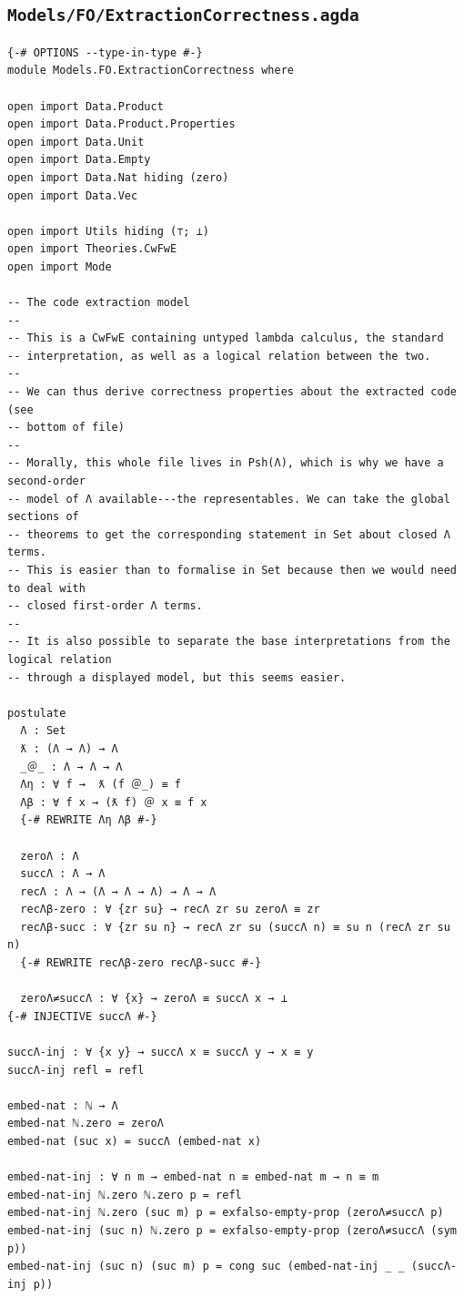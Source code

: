 \documentclass[10pt,a4paper]{article}
\theoremstyle{definition}
\theoremstyle{remark}
\begin{document}
\subsection*{\texttt{Models/FO/ExtractionCorrectness.agda}}
{\agdafont\begin{Verbatim}[breaklines=true,breakanywhere=true,fontsize=\scriptsize]
{-# OPTIONS --type-in-type #-}
module Models.FO.ExtractionCorrectness where

open import Data.Product
open import Data.Product.Properties
open import Data.Unit
open import Data.Empty
open import Data.Nat hiding (zero)
open import Data.Vec

open import Utils hiding (⊤; ⊥)
open import Theories.CwFwE
open import Mode

-- The code extraction model
--
-- This is a CwFwE containing untyped lambda calculus, the standard
-- interpretation, as well as a logical relation between the two.
--
-- We can thus derive correctness properties about the extracted code (see
-- bottom of file)
--
-- Morally, this whole file lives in Psh(Λ), which is why we have a second-order
-- model of Λ available---the representables. We can take the global sections of
-- theorems to get the corresponding statement in Set about closed Λ terms.
-- This is easier than to formalise in Set because then we would need to deal with
-- closed first-order Λ terms.
--
-- It is also possible to separate the base interpretations from the logical relation
-- through a displayed model, but this seems easier.

postulate
  Λ : Set
  ƛ : (Λ → Λ) → Λ
  _＠_ : Λ → Λ → Λ
  Λη : ∀ f →  ƛ (f ＠_) ≡ f
  Λβ : ∀ f x → (ƛ f) ＠ x ≡ f x
  {-# REWRITE Λη Λβ #-}

  zeroΛ : Λ
  succΛ : Λ → Λ
  recΛ : Λ → (Λ → Λ → Λ) → Λ → Λ
  recΛβ-zero : ∀ {zr su} → recΛ zr su zeroΛ ≡ zr
  recΛβ-succ : ∀ {zr su n} → recΛ zr su (succΛ n) ≡ su n (recΛ zr su n)
  {-# REWRITE recΛβ-zero recΛβ-succ #-}

  zeroΛ≠succΛ : ∀ {x} → zeroΛ ≡ succΛ x → ⊥
{-# INJECTIVE succΛ #-}

succΛ-inj : ∀ {x y} → succΛ x ≡ succΛ y → x ≡ y
succΛ-inj refl = refl

embed-nat : ℕ → Λ
embed-nat ℕ.zero = zeroΛ
embed-nat (suc x) = succΛ (embed-nat x)

embed-nat-inj : ∀ n m → embed-nat n ≡ embed-nat m → n ≡ m
embed-nat-inj ℕ.zero ℕ.zero p = refl
embed-nat-inj ℕ.zero (suc m) p = exfalso-empty-prop (zeroΛ≠succΛ p)
embed-nat-inj (suc n) ℕ.zero p = exfalso-empty-prop (zeroΛ≠succΛ (sym p))
embed-nat-inj (suc n) (suc m) p = cong suc (embed-nat-inj _ _ (succΛ-inj p))


\end{Verbatim}}
\end{document}
